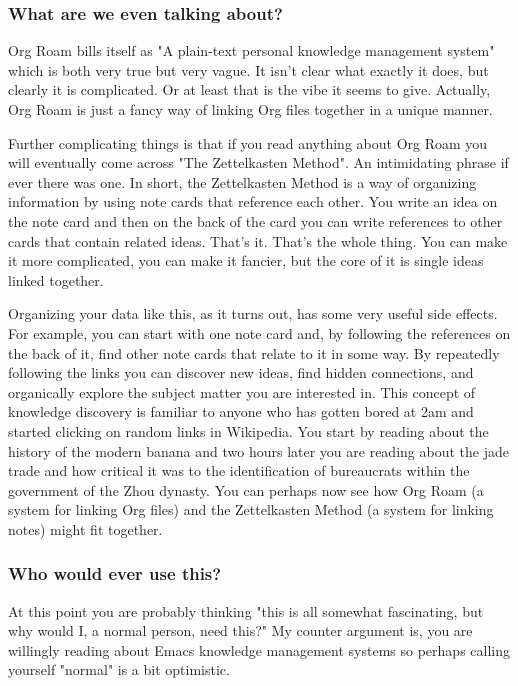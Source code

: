 \documentclass[11pt]{article}
\begin{document}
\subsubsection*{What are we even talking about?}
\label{sec:org56ed49c}
Org Roam bills itself as "A plain-text personal knowledge management system" which is both very true but very vague. It isn't clear what exactly it does, but clearly it is complicated. Or at least that is the vibe it seems to give. Actually, Org Roam is just a fancy way of linking Org files together in a unique manner.

Further complicating things is that if you read anything about Org Roam you will eventually come across "The Zettelkasten Method". An intimidating phrase if ever there was one. In short, the Zettelkasten Method is a way of organizing information by using note cards that reference each other. You write an idea on the note card and then on the back of the card you can write references to other cards that contain related ideas. That's it. That's the whole thing. You can make it more complicated, you can make it fancier, but the core of it is single ideas linked together.

Organizing your data like this, as it turns out, has some very useful side effects. For example, you can start with one note card and, by following the references on the back of it, find other note cards that relate to it in some way. By repeatedly following the links you can discover new ideas, find hidden connections, and organically explore the subject matter you are interested in. This concept of knowledge discovery is familiar to anyone who has gotten bored at 2am and started clicking on random links in Wikipedia. You start by reading about the history of the modern banana and two hours later you are reading about the jade trade and how critical it was to the identification of bureaucrats within the government of the Zhou dynasty. You can perhaps now see how Org Roam (a system for linking Org files) and the Zettelkasten Method (a system for linking notes) might fit together.
\subsubsection*{Who would ever use this?}
\label{sec:orgf746726}
At this point you are probably thinking "this is all somewhat fascinating, but why would I, a normal person, need this?" My counter argument is, you are willingly reading about Emacs knowledge management systems so perhaps calling yourself "normal" is a bit optimistic.
\end{document}
